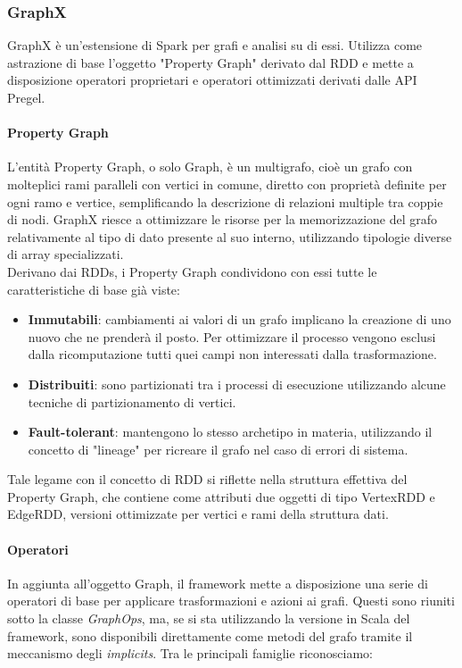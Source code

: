 \subsubsection{GraphX}

GraphX \cite{spark_graph_doc} è un'estensione di Spark per grafi e analisi su di essi. Utilizza come astrazione di base l'oggetto "Property Graph" derivato dal RDD e mette a disposizione operatori proprietari e operatori ottimizzati derivati dalle API Pregel.

\paragraph{Property Graph}
L'entità Property Graph, o solo Graph, è un multigrafo, cioè un grafo con molteplici rami paralleli con vertici in comune, diretto con proprietà definite per ogni ramo e vertice, semplificando la descrizione di relazioni multiple tra coppie di nodi. GraphX riesce a ottimizzare le risorse per la memorizzazione del grafo relativamente al tipo di dato presente al suo interno, utilizzando tipologie diverse di array specializzati.\\
Derivano dai RDDs, i Property Graph condividono con essi tutte le caratteristiche di base già viste:
 
\begin{itemize}
	\item \textbf{Immutabili}: cambiamenti ai valori di un grafo implicano la creazione di uno nuovo che ne prenderà il posto. Per ottimizzare il processo vengono esclusi dalla ricomputazione tutti quei campi non interessati dalla trasformazione.
	
	\item \textbf{Distribuiti}: sono partizionati tra i processi di esecuzione utilizzando alcune tecniche di partizionamento di vertici.
	
	\item \textbf{Fault-tolerant}: mantengono lo stesso archetipo in materia, utilizzando il concetto di "lineage" per ricreare il grafo nel caso di errori di sistema.
\end{itemize}
Tale legame con il concetto di RDD si riflette nella struttura effettiva del Property Graph, che contiene come attributi due oggetti di tipo VertexRDD e EdgeRDD, versioni ottimizzate per vertici e rami della struttura dati.

\paragraph{Operatori}
In aggiunta all'oggetto Graph, il framework mette a disposizione una serie di operatori di base per applicare trasformazioni e azioni ai grafi. Questi sono riuniti sotto la classe \textit{GraphOps}, ma, se si sta utilizzando la versione in Scala del framework, sono disponibili direttamente come metodi del grafo tramite il meccanismo degli \textit{implicits}. Tra le principali famiglie riconosciamo:

